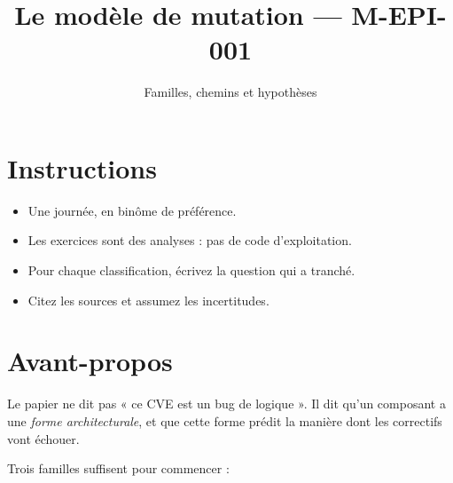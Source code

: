 \documentclass{training}
\begin{document}
\title{Le modèle de mutation --- M-EPI-001}
\subtitle{Familles, chemins et hypothèses}
\maketitle

\newpage
\tableofcontents
\newpage

\chapter{Instructions}
\begin{itemize}
  \item Une journée, en binôme de préférence.
  \item Les exercices sont des analyses : pas de code d'exploitation.
  \item Pour chaque classification, écrivez la question qui a tranché.
  \item Citez les sources et assumez les incertitudes.
\end{itemize}





\chapter{Avant-propos}

Le papier ne dit pas « ce CVE est un bug de logique ». Il dit qu'un
composant a une \emph{forme architecturale}, et que cette forme prédit la
manière dont les correctifs vont échouer.

Trois familles suffisent pour commencer :
\end{document}
